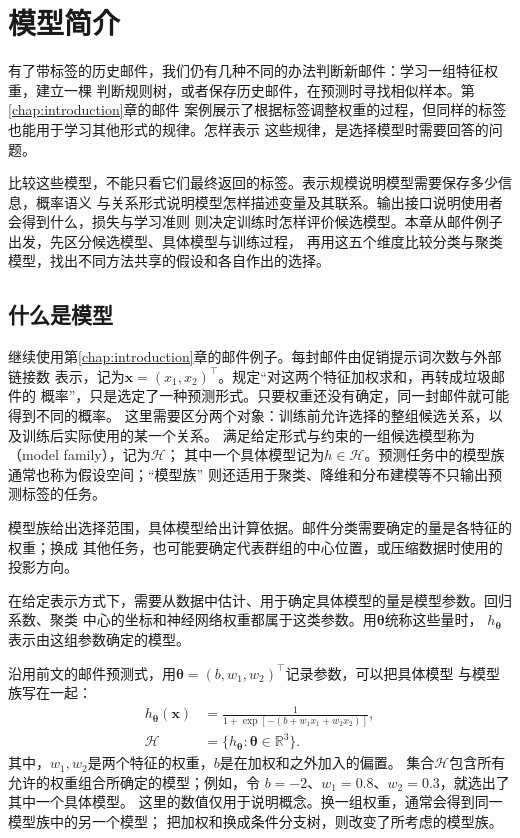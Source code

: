 \chapter{模型简介}
\label{chap:machine-learning-models}

有了带标签的历史邮件，我们仍有几种不同的办法判断新邮件：学习一组特征权重，建立一棵
判断规则树，或者保存历史邮件，在预测时寻找相似样本。第\ref{chap:introduction}章的邮件
案例展示了根据标签调整权重的过程，但同样的标签也能用于学习其他形式的规律。怎样表示
这些规律，是选择模型时需要回答的问题。

比较这些模型，不能只看它们最终返回的标签。表示规模说明模型需要保存多少信息，概率语义
与关系形式说明模型怎样描述变量及其联系。输出接口说明使用者会得到什么，损失与学习准则
则决定训练时怎样评价候选模型。本章从邮件例子出发，先区分候选模型、具体模型与训练过程，
再用这五个维度比较分类与聚类模型，找出不同方法共享的假设和各自作出的选择。

\section{什么是模型}
\label{sec:models-meaning}

继续使用第\ref{chap:introduction}章的邮件例子。每封邮件由促销提示词次数与外部链接数
表示，记为$\bm{x}=(x_1,x_2)^{\top}$。规定“对这两个特征加权求和，再转成垃圾邮件的
概率”，只是选定了一种预测形式。只要权重还没有确定，同一封邮件就可能得到不同的概率。
这里需要区分两个对象：训练前允许选择的整组候选关系，以及训练后实际使用的某一个关系。
满足给定形式与约束的一组候选模型称为（model family），记为$\mathcal H$；
其中一个具体模型记为$h\in\mathcal H$。预测任务中的模型族通常也称为假设空间；“模型族”
则还适用于聚类、降维和分布建模等不只输出预测标签的任务。

模型族给出选择范围，具体模型给出计算依据。邮件分类需要确定的量是各特征的权重；换成
其他任务，也可能要确定代表群组的中心位置，或压缩数据时使用的投影方向。

在给定表示方式下，需要从数据中估计、用于确定具体模型的量是模型参数。回归系数、聚类
中心的坐标和神经网络权重都属于这类参数。用$\bm{\theta}$统称这些量时，
$h_{\bm{\theta}}$表示由这组参数确定的模型。

沿用前文的邮件预测式，用$\bm{\theta}=(b,w_1,w_2)^{\top}$记录参数，可以把具体模型
与模型族写在一起：
\begin{equation}
  \begin{aligned}
    h_{\bm{\theta}}(\bm{x})
      &=\frac{1}{1+\exp[-(b+w_1x_1+w_2x_2)]},\\
    \mathcal{H}&=\{h_{\bm{\theta}}:\bm{\theta}\in\mathbb{R}^{3}\}.
  \end{aligned}
  \label{eq:models-family-example}
\end{equation}
其中，$w_1,w_2$是两个特征的权重，$b$是在加权和之外加入的偏置。
集合$\mathcal{H}$包含所有允许的权重组合所确定的模型；例如，令
$b=-2$、$w_1=0.8$、$w_2=0.3$，就选出了其中一个具体模型。
这里的数值仅用于说明概念。换一组权重，通常会得到同一模型族中的另一个模型；
把加权和换成条件分支树，则改变了所考虑的模型族。

